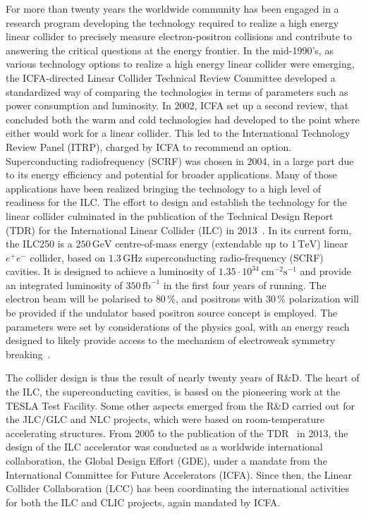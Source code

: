 \documentclass[%
 reprint,
 amsmath,amssymb,
 aps,
]{revtex4-1}
\begin{document}
For more than twenty years the worldwide community has been engaged in a research program developing the technology required to realize a high energy linear collider to precisely measure electron-positron collisions and contribute to answering the critical questions at the energy frontier. In the mid-1990's, as various technology options to realize a high energy linear collider were emerging, the ICFA-directed Linear Collider Technical Review Committee developed a standardized way of comparing the  technologies in terms of parameters such as power consumption and luminosity. In 2002, ICFA set up a second review, that concluded both the warm and cold technologies had developed to the point where either would work for a linear collider. This led to the International Technology Review Panel (ITRP), charged by ICFA to recommend an option. Superconducting radiofrequency (SCRF) was chosen in 2004, in a large part due to its energy efficiency and potential for broader applications.  Many of those applications have been realized bringing the technology to a high level of readiness for the ILC. The effort to design and establish the technology for the linear collider culminated in the publication of the Technical Design Report (TDR) for the International Linear Collider (ILC) in 2013~\cite{Behnke:2013xla}. In its current form, the ILC250 is a $250\,{\mathrm{GeV}}$ centre-of-mass energy (extendable up to $1\,{\mathrm{TeV}}$) linear $e^+e^-$ collider, based on $1.3\,{\mathrm{GHz}}$ superconducting radio-frequency (SCRF) cavities. It is designed to achieve a luminosity of $1.35\cdot 10^{34}~{\mathrm{cm}}^{-2}{\mathrm{s}}^{-1}$ and provide an integrated luminosity of $350\,{\mathrm{fb}}^{-1}$ in the first four years of running. The electron beam will be polarised to $80\,\%$, and positrons with $30\,\%$ polarization will be provided if the undulator based positron source concept is employed. The parameters were set by considerations of the physics goal, with an energy reach designed to likely provide access to the mechanism of electroweak symmetry breaking~\cite{Baer:2013cma}.


The collider design is thus the result of nearly twenty years of R\&D. The heart of the ILC, the superconducting cavities, is based on the pioneering work at the TESLA Test Facility. Some other aspects emerged from the R\&D carried out for the JLC/GLC and NLC projects, which were based on room-temperature accelerating structures. From 2005 to the publication of the TDR~\cite{Behnke:2013xla} in 2013, the design of the ILC accelerator was conducted as a worldwide international collaboration, the Global Design Effort (GDE), under a mandate from the International Committee for Future Accelerators (ICFA). Since then, the Linear Collider Collaboration (LCC) has been coordinating the international activities for both the ILC and CLIC projects, again mandated by ICFA.
\end{document}
